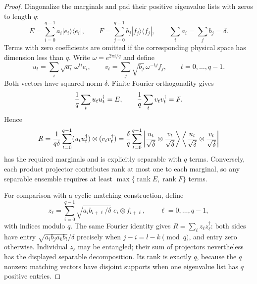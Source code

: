 \begin{proof}
Diagonalize the marginals and pad their positive eigenvalue lists with zeros
to length $q$:
\[
 E=\sum_{i=0}^{q-1}a_i|e_i\rangle\langle e_i|,
 \qquad F=\sum_{j=0}^{q-1}b_j|f_j\rangle\langle f_j|,
 \qquad \sum_i a_i=\sum_jb_j=\delta.
\]
Terms with zero coefficients are omitted if the corresponding physical
space has dimension less than $q$. Write $\omega=e^{2\pi i/q}$ and define
\[
 u_t=\sum_i\sqrt{a_i}\,\omega^{ti}e_i,
 \qquad v_t=\sum_j\sqrt{b_j}\,\omega^{-tj}f_j,
 \qquad t=0,\ldots,q-1.
\]
Both vectors have squared norm $\delta$. Finite Fourier orthogonality gives
\[
 {1\over q}\sum_tu_tu_t^\dagger=E,
 \qquad {1\over q}\sum_tv_tv_t^\dagger=F.
\]
Hence
\[
 R={1\over q\delta}\sum_{t=0}^{q-1}
       (u_tu_t^\dagger)\otimes(v_tv_t^\dagger)
   ={\delta\over q}\sum_{t=0}^{q-1}
       \left|{u_t\over\sqrt\delta}\otimes
                    {v_t\over\sqrt\delta}\right\rangle
       \left\langle{u_t\over\sqrt\delta}\otimes
                    {v_t\over\sqrt\delta}\right|
\]
has the required marginals and is explicitly separable with $q$ terms.
Conversely, each product projector contributes rank at most one to each
marginal, so any separable ensemble requires at least
$\max\{\operatorname{rank}E,\operatorname{rank}F\}$ terms.

For comparison with a cyclic-matching construction, define
\[
 z_\ell=\sum_{i=0}^{q-1}
       \sqrt{a_i b_{i+\ell}/\delta}\;e_i\otimes f_{i+\ell},
       \qquad \ell=0,\ldots,q-1,
\]
with indices modulo $q$. The same Fourier identity gives
$R=\sum_\ell z_\ell z_\ell^\dagger$: both sides have entry
$\sqrt{a_i b_j a_k b_l}/\delta$ precisely when
$j-i=l-k\pmod q$, and entry zero otherwise. Individual $z_\ell$ may be
entangled; their sum of projectors nevertheless has the displayed
separable decomposition. Its rank is exactly $q$, because the $q$
nonzero matching vectors have disjoint supports when one eigenvalue
list has $q$ positive entries.
\end{proof}

